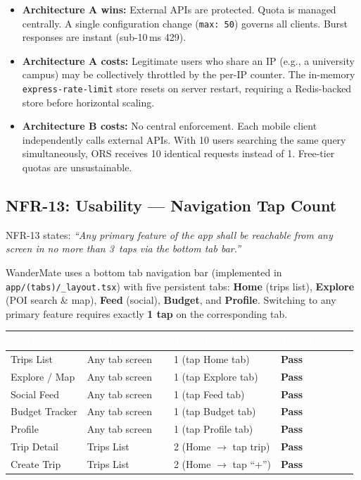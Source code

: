 \documentclass[12pt, a4paper]{article}
\newcommand{\thcell}[1]{\textcolor{white}{\textbf{\small #1}}}
\newcommand{\code}[1]{\texttt{\small #1}}
\newcommand{\reqid}[1]{\textsc{\small #1}}
\begin{document}
\begin{itemize}
  \item \textbf{Architecture A wins:} External APIs are protected. Quota is managed centrally. A single configuration change (\texttt{max: 50}) governs all clients. Burst responses are instant (sub-10\,ms 429).
  \item \textbf{Architecture A costs:} Legitimate users who share an IP (e.g., a university campus) may be collectively throttled by the per-IP counter. The in-memory \texttt{express-rate-limit} store resets on server restart, requiring a Redis-backed store before horizontal scaling.
  \item \textbf{Architecture B costs:} No central enforcement. Each mobile client independently calls external APIs. With 10 users searching the same query simultaneously, ORS receives 10 identical requests instead of 1. Free-tier quotas are unsustainable.
\end{itemize}

\subsection{NFR-13: Usability --- Navigation Tap Count}

\reqid{NFR-13} states: \emph{``Any primary feature of the app shall be reachable from any screen in no more than 3~taps via the bottom tab bar.''}

WanderMate uses a bottom tab navigation bar (implemented in \code{app/(tabs)/\_layout.tsx}) with five persistent tabs: \textbf{Home} (trips list), \textbf{Explore} (POI search \& map), \textbf{Feed} (social), \textbf{Budget}, and \textbf{Profile}. Switching to any primary feature requires exactly \textbf{1 tap} on the corresponding tab.

\begin{longtable}{L{3.2cm} L{4.0cm} C{2.5cm} C{3.0cm}}
\toprule
{}
\thcell{Feature} & \thcell{Starting Screen} & \thcell{Taps Required} & \thcell{Target ($\leq$ 3)} \\
\midrule
\endhead
\bottomrule
\endfoot

Trips List & Any tab screen & 1 (tap Home tab) & \textbf{Pass} \\
Explore / Map & Any tab screen & 1 (tap Explore tab) & \textbf{Pass} \\
Social Feed & Any tab screen & 1 (tap Feed tab) & \textbf{Pass} \\
Budget Tracker & Any tab screen & 1 (tap Budget tab) & \textbf{Pass} \\
Profile & Any tab screen & 1 (tap Profile tab) & \textbf{Pass} \\
Trip Detail & Trips List & 2 (Home $\to$ tap trip) & \textbf{Pass} \\
Create Trip & Trips List & 2 (Home $\to$ tap ``+'') & \textbf{Pass} \\
\end{longtable}
\end{document}
